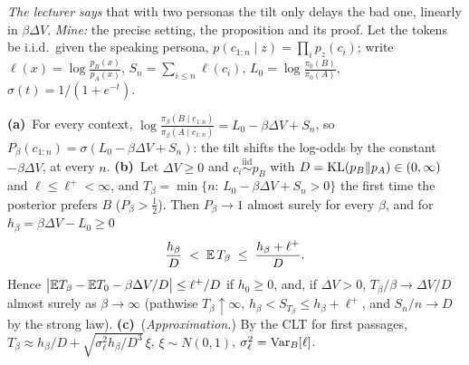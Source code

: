 \begin{beyond}\label{box:L7-two}
\emph{The lecturer says} that with two personas the tilt only delays the bad one, linearly in $\beta\Delta V$. \emph{Mine:} the precise setting, the proposition and its proof. Let the tokens be i.i.d.\ given the speaking persona, $p(c_{1:n}\mid z)=\prod_ip_z(c_i)$; write $\ell(x)=\log\frac{p_B(x)}{p_A(x)}$, $S_n=\sum_{i\le n}\ell(c_i)$, $L_0=\log\frac{\pi_0(B)}{\pi_0(A)}$, $\sigma(t)=1/(1+e^{-t})$.

\label{prop:L7-two}
\textbf{(a)}~For every context, $\log\frac{\pi_\beta(B\mid c_{1:n})}{\pi_\beta(A\mid c_{1:n})}=L_0-\beta\Delta V+S_n$, so $P_\beta(c_{1:n})=\sigma(L_0-\beta\Delta V+S_n)$: the tilt shifts the log-odds by the constant $-\beta\Delta V$, at every $n$.
\textbf{(b)}~Let $\Delta V\ge0$ and $c_i\overset{\text{iid}}{\sim}p_B$ with $D=\operatorname{KL}(p_B\|p_A)\in(0,\infty)$ and $\ell\le\ell^+<\infty$, and $T_\beta=\min\{n:\,L_0-\beta\Delta V+S_n>0\}$ the first time the posterior prefers $B$ ($P_\beta>\frac12$). Then $P_\beta\to1$ almost surely for every $\beta$, and for $h_\beta=\beta\Delta V-L_0\ge0$
\begin{equation}\label{eq:L7-wald}
   \frac{h_\beta}{D}\;<\;\mathbb{E}\,T_\beta\;\le\;\frac{h_\beta+\ell^+}{D}.
\end{equation}
Hence $\big|\mathbb{E} T_\beta-\mathbb{E} T_0-\beta\Delta V/D\big|\le\ell^+/D$ if $h_0\ge0$, and, if $\Delta V>0$, $T_\beta/\beta\to\Delta V/D$ almost surely as $\beta\to\infty$ (pathwise $T_\beta\uparrow\infty$, $h_\beta<S_{T_\beta}\le h_\beta+\ell^+$, and $S_n/n\to D$ by the strong law).
\textbf{(c)}~(\emph{Approximation.}) By the CLT for first passages, $T_\beta\approx h_\beta/D+\sqrt{\sigma_\ell^2h_\beta/D^3}\,\xi$, $\xi\sim N(0,1)$, $\sigma_\ell^2=\operatorname{Var}_B[\ell]$.


\end{beyond}
